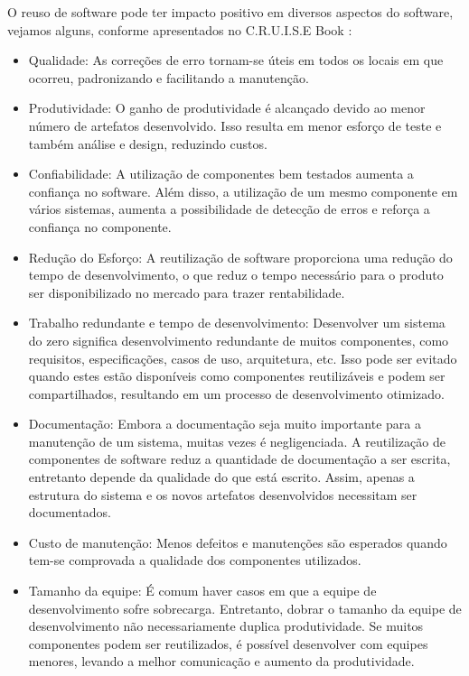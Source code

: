 O reuso de software pode ter impacto positivo em diversos aspectos do software, vejamos alguns, conforme apresentados no C.R.U.I.S.E Book \citep{cruise2007} :

\begin{itemize}

\item Qualidade: As correções de erro tornam-se úteis em todos os locais em que ocorreu, padronizando e facilitando a manutenção.

\item Produtividade: O ganho de produtividade é alcançado devido ao menor número de artefatos desenvolvido. Isso resulta em menor esforço de teste e também análise e design, reduzindo custos.

\item Confiabilidade: A utilização de componentes bem testados aumenta a
confiança no software. Além disso, a utilização de um mesmo componente em vários sistemas, aumenta a possibilidade de detecção de erros e reforça a confiança no componente.

\item Redução do Esforço: A reutilização de software proporciona uma redução do tempo de desenvolvimento, o que reduz o tempo necessário para o produto ser disponibilizado no mercado para trazer rentabilidade.

\item Trabalho redundante e tempo de desenvolvimento: Desenvolver um sistema do
zero significa desenvolvimento redundante de muitos componentes, como requisitos, especificações, casos de uso, arquitetura, etc. Isso pode ser evitado quando estes estão disponíveis como componentes reutilizáveis e podem ser compartilhados, resultando em um processo de desenvolvimento otimizado.

\item Documentação: Embora a documentação seja muito importante para a
manutenção de um sistema, muitas vezes é negligenciada. A reutilização de componentes de software reduz a quantidade de documentação a ser escrita, entretanto depende da qualidade do que está escrito. Assim, apenas a estrutura do sistema e os novos artefatos desenvolvidos necessitam ser documentados.

\item Custo de manutenção: Menos defeitos e manutenções são esperados quando tem-se comprovada a qualidade dos componentes utilizados.

\item Tamanho da equipe: É comum haver casos em que a equipe de desenvolvimento sofre sobrecarga. Entretanto, dobrar o tamanho da equipe de desenvolvimento não necessariamente duplica produtividade. Se muitos componentes podem ser reutilizados, é possível desenvolver com equipes menores, levando a melhor comunicação e aumento da produtividade.

\end{itemize}

